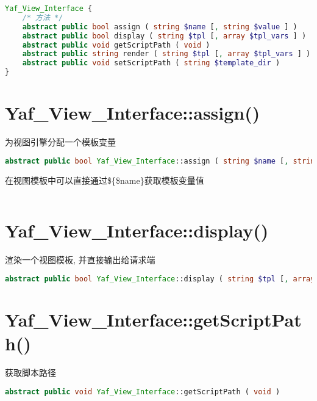 \begin{lstlisting}[language=PHP]
Yaf_View_Interface {
    /* 方法 */
    abstract public bool assign ( string $name [, string $value ] )
    abstract public bool display ( string $tpl [, array $tpl_vars ] )
    abstract public void getScriptPath ( void )
    abstract public string render ( string $tpl [, array $tpl_vars ] )
    abstract public void setScriptPath ( string $template_dir )
}
\end{lstlisting}

\section{Yaf\_View\_Interface::assign()}

为视图引擎分配一个模板变量

\begin{lstlisting}[language=PHP]
abstract public bool Yaf_View_Interface::assign ( string $name [, string $value ] )
\end{lstlisting}

在视图模板中可以直接通过\$\{\$name\}获取模板变量值

\begin{lstlisting}[language=PHP]

\end{lstlisting}

\section{Yaf\_View\_Interface::display()}

渲染一个视图模板, 并直接输出给请求端


\begin{lstlisting}[language=PHP]
abstract public bool Yaf_View_Interface::display ( string $tpl [, array $tpl_vars ] )
\end{lstlisting}





\section{Yaf\_View\_Interface::getScriptPath()}

获取脚本路径

\begin{lstlisting}[language=PHP]
abstract public void Yaf_View_Interface::getScriptPath ( void )
\end{lstlisting}

